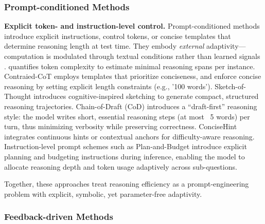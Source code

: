 \documentclass[11pt]{article}
\begin{document}
\subsubsection{Prompt-conditioned Methods}
\label{sec:prompt-conditioning}

\textbf{Explicit token- and instruction-level control.}
Prompt-conditioned methods introduce explicit instructions, control tokens, or concise templates that determine reasoning length at test time.
They embody \emph{external} adaptivity—computation is modulated through textual conditions rather than learned signals \citep{cai2025does}.
\citet{Lee2025TokenComplexity} quantifies token complexity to estimate minimal reasoning spans per instance.
Contraied-CoT \citep{Nayab2025ConciseThoughts} employs templates that prioritize conciseness, and enforce concise reasoning by setting explicit length constraints (e.g., '100 words'). Sketch-of-Thought \citep{aytes2025sketchofthoughtefficientllmreasoning}
 introduces cognitive-inspired sketching to generate compact, structured reasoning trajectories.
 {Chain-of-Draft} (CoD) \citep{Xu2025ChainOfDraft} introduces a “draft-first” reasoning style: the model writes short, essential reasoning steps (at most ~5 words) per turn, thus minimizing verbosity while preserving correctness. {ConciseHint} \citep{Tang2025ConciseHint} integrates continuous hints or contextual anchors for difficulty-aware reasoning.
Instruction-level prompt schemes such as Plan-and-Budget \citep{Lin2025PlanBudget}
introduce explicit planning and budgeting instructions during inference,
enabling the model to allocate reasoning depth and token usage adaptively
across sub-questions.

Together, these approaches treat reasoning efficiency as a prompt-engineering problem with {explicit, symbolic, yet parameter-free} adaptivity.

\subsubsection{Feedback-driven Methods}
\label{sec:feedback}
\end{document}
